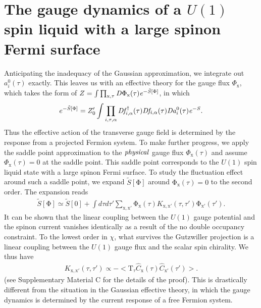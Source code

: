 \documentclass[12pt]{article}
\begin{document}
\section*{The gauge dynamics of a $U(1)$ spin liquid with a large spinon Fermi surface}
Anticipating the inadequacy of the Gaussian approximation, we integrate out $a^{0}_{i}(\tau)$ exactly. This leaves us with an effective theory for the gauge flux $\Phi_{\mathrm{x}}$, which takes the form of $Z= \int \prod_{\mathrm{x},\tau} \it{D}\mathrm{\Phi}_{\mathrm{x}}(\tau) e^{-\tilde{S}[\mathrm{\Phi}]}$, in which
 \begin{eqnarray}
e^{-\tilde{S}[\Phi]}= Z'_{0} \int \prod_{i,\tau,\alpha} \it{D}f^{\dagger}_{i,\alpha}(\tau)\it{D}f_{i,\alpha}(\tau)\it{D}a^{\mathrm{0}}_{i}(\tau)e^{-S}.\nonumber
\end{eqnarray}
Thus the effective action of the transverse gauge field is determined by the response from a projected Fermion system. To make further progress, we apply the saddle point approximation to the $\it{physical}$ gauge flux $\Phi_{\mathrm{x}}(\tau)$ and assume $\Phi_{\mathrm{x}}(\tau)=0$ at the saddle point. This saddle point corresponds to the $U(1)$ spin liquid state with a large spinon Fermi surface.  To study the fluctuation effect around such a saddle point,
we expand $\tilde{S}[\mathrm{\Phi}]$ around $\mathrm{\Phi}_{\mathrm{x}}(\tau)=0$ to the second order. The expansion reads
\begin{eqnarray}
\tilde{S}[\mathrm{\Phi}]\simeq \tilde{S}[0]+\int d\tau d\tau' \sum_{\mathrm{x,x'}} \mathrm{\Phi}_{\mathrm{x}}(\tau) K_{\mathrm{x,x'}}(\tau,\tau') \mathrm{\Phi}_{\mathrm{x'}}(\tau').\nonumber
\end{eqnarray}
It can be shown that the linear coupling between the $U(1)$ gauge potential and the spinon current vanishes identically as a result of the no double occupancy constraint. To the lowest order in $\chi$, what survives the Gutzwiller projection is a linear coupling between the $U(1)$ gauge flux and the scalar spin chirality. We thus have
\begin{eqnarray}
K_{\mathrm{x,x'}}(\tau,\tau')\propto -<\mathrm{T}_{\tau}\hat{C}_{\mathrm{x}}(\tau)\hat{C}_{\mathrm{x'}}(\tau')>.\nonumber
\end{eqnarray}
(see Supplementary Material C for the details of the proof). This is drastically different from the situation in the Gaussian effective theory, in which the gauge dynamics is determined by the current response of a free Fermion system.
\end{document}
